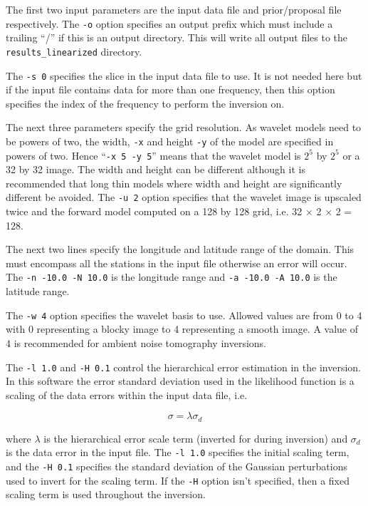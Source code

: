 \documentclass[a4paper,12pt]{article}
\begin{document}
The first two input parameters are the input data file and prior/proposal file respectively.
The {\tt -o} option specifies an output prefix which must include a trailing ``/'' if this
is an output directory. This will write all output files to the {\tt results\_linearized}
directory.

The {\tt -s 0} specifies the slice in the input data file to use. It is not needed here but
if the input file contains data for more than one frequency, then this option specifies
the index of the frequency to perform the inversion on.

The next three parameters specify the grid resolution. As wavelet models need to be powers
of two, the width, {\tt -x} and height {\tt -y} of the model are specified in powers of
two. Hence ``{\tt -x 5 -y 5}'' means that the wavelet model is $2^5$ by $2^5$ or a 32 by 32
image. The width and height can be different although it is recommended that long thin
models where width and height are significantly different be avoided. The {\tt -u 2} option
specifies that the wavelet image is upscaled twice and the forward model computed on a
128 by 128 grid, i.e. 32 $\times$ 2 $\times$ 2 = 128.

The next two lines specify the longitude and latitude range of the domain. This must
encompass all the stations in the input file otherwise an error will occur. The
{\tt -n -10.0 -N 10.0} is the longitude range and {\tt -a -10.0 -A 10.0} is the latitude
range.

The {\tt -w 4} option specifies the wavelet basis to use. Allowed values are from 0
to 4 with 0 representing a blocky image to 4 representing a smooth image. A value of
4 is recommended for ambient noise tomography inversions.

The {\tt -l 1.0} and {\tt -H 0.1} control the hierarchical error estimation in the inversion.
In this software the error standard deviation used in the likelihood function is a
scaling of the data errors within the input data file, i.e.

\begin{equation}
  \sigma = \lambda \sigma_d
\end{equation}

where $\lambda$ is the hierarchical error scale term (inverted for
during inversion) and $\sigma_d$ is the data error in the input
file. The {\tt -l 1.0} specifies the initial scaling term, and the
{\tt -H 0.1} specifies the standard deviation of the Gaussian
perturbations used to invert for the scaling term. If the {\tt -H}
option isn't specified, then a fixed scaling term is used throughout
the inversion.
\end{document}
